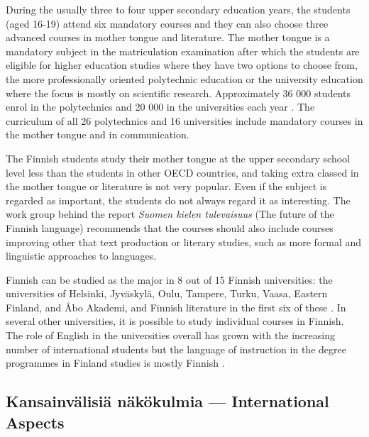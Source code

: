 \documentclass[]{../../metanetpaper}
\begin{document}
\begin{Parallel}[c]{70mm}{70mm}
{During the usually three to four upper secondary education years, the
students (aged 16-19) attend six mandatory courses and they can also
choose three advanced courses in mother tongue and literature. The
mother tongue is a mandatory subject in the matriculation examination
after which the students are eligible for higher education studies
where they have two options to choose from, the more professionally
oriented polytechnic education or the university education where the
focus is mostly on scientific research. Approximately 36 000 students
enrol in the polytechnics and 20 000 in the universities each year
\cite{Education}. The curriculum of all 26 polytechnics and 16
universities include mandatory courses in the mother tongue and in
communication.

The Finnish students study their mother tongue at the upper secondary
school level less than the students in other OECD countries, and
taking extra classed in the mother tongue or literature is not very
popular. Even if the subject is regarded as important, the students do
not always regard it as interesting. The work group behind the report
\textit{\foreignlanguage{finnish}{Suomen kielen tulevaisuus}} (The
future of the Finnish language) \cite{Tulevaisuus2009} recommends that
the courses should also include courses improving other that text
production or literary studies, such as more formal and linguistic
approaches to languages.

Finnish can be studied as the major in 8 out of 15 Finnish
universities: the universities of Helsinki, Jyväskylä, Oulu, Tampere,
Turku, Vaasa, Eastern Finland, and Åbo Akademi, and Finnish literature
in the first six of these \cite{hum-ulko}. In several other
universities, it is possible to study individual courses in
Finnish. The role of English in the universities overall has grown
with the increasing number of international students but the language
of instruction in the degree programmes in Finland studies is mostly
Finnish \cite{Board}.
}

\ParallelPar

\subsection{Kansainvälisiä näkökulmia --- International Aspects}

\end{Parallel}
\end{document}
